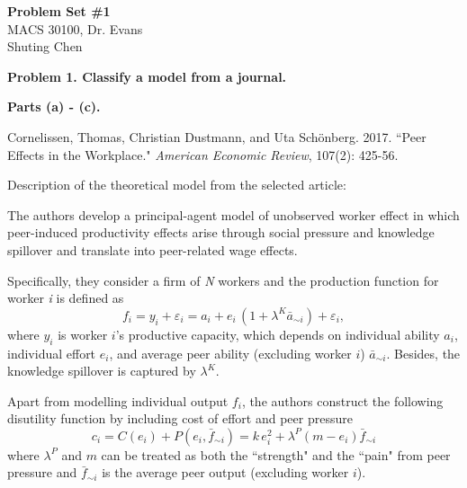 \documentclass[letterpaper,12pt]{article}
\theoremstyle{definition}
\begin{document}
\begin{flushleft}
  \textbf{\large{Problem Set \#1}} \\
  MACS 30100, Dr. Evans\\
  Shuting Chen 
\end{flushleft}

\vspace{5mm}

\noindent\textbf{Problem 1. Classify a model from a journal.}
\vspace{2mm}

\noindent\textbf{Parts (a) - (c).} 
\vspace{1mm}

\noindent{} 

\noindent Cornelissen, Thomas, Christian Dustmann, and Uta Sch\"{o}nberg. 2017. ``Peer Effects in the Workplace." \textit{American Economic Review}, 107(2): 425-56. 
\vspace{2mm}

\noindent Description of the theoretical model from the selected article: 

The authors develop a principal-agent model of unobserved worker effect in which peer-induced productivity effects arise through social pressure and knowledge spillover and translate into peer-related wage effects. 

Specifically, they consider a firm of \textit{N} workers and the production function for worker \textit{i} is defined as
\begin{equation} \label{1}
f_i = y_i + \varepsilon_i = a_i + e_i\,(1 + \lambda^K \bar{a}_{\sim i}) + \varepsilon_i, 
\end{equation}
where $y_i$ is worker $i$'s productive capacity, which depends on individual ability $a_i$, individual effort $e_i$, and average peer ability (excluding worker $i$) $\bar{a}_{\sim i}$. Besides, the knowledge spillover is captured by $\lambda^K$. 

Apart from modelling individual output $f_i$, the authors construct the following disutility function by including cost of effort and peer pressure 
\begin{equation} \label{2}
    c_i = C(e_i) + P(e_i, \bar{f}_{\sim i}) = k\,e_i^2 + \lambda^P (m-e_i)\bar{f}_{\sim i}
\end{equation}
where $\lambda^P$ and $m$ can be treated as both the ``strength" and the ``pain" from peer pressure and $\bar{f}_{\sim i}$ is the average peer output (excluding worker $i$). 
\vspace{1mm}
\end{document}
